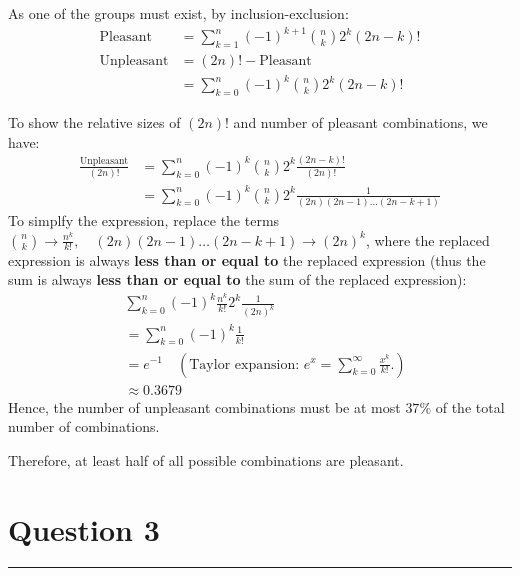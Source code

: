 \documentclass{article}
\begin{document}
\begin{enumerate}[label=(\alph*)]
          As one of the groups must exist, by inclusion-exclusion:
          \begin{align*}
              \text{Pleasant}   & = \sum_{k=1}^{n}(-1)^{k+1}\binom{n}{k}2^{k}(2n-k)! \\
              \text{Unpleasant} & = (2n)! - \text{Pleasant}                          \\
                                & =  \sum_{k=0}^{n}(-1)^{k}\binom{n}{k}2^{k}(2n-k)!
          \end{align*}

          To show the relative sizes of $(2n)!$ and number of pleasant combinations, we have:
          \begin{align*}
              \frac{\text{Unpleasant}}{(2n)!} & = \sum_{k=0}^{n}(-1)^{k}\binom{n}{k}2^{k}\frac{(2n-k)!}{(2n)!}              \\
                                              & = \sum_{k=0}^{n}(-1)^{k}\binom{n}{k}2^{k}\frac{1}{(2n)(2n-1)\ldots(2n-k+1)}
          \end{align*}
          To simplfy the expression, replace the terms $\binom{n}{k} \to \frac{n^k}{k!},\quad (2n)(2n-1)\ldots(2n-k+1) \to (2n)^k$, where the replaced expression is always \textbf{less than or equal to} the replaced expression (thus the sum is always \textbf{less than or equal to} the sum of the replaced expression):
          \begin{align*}
               & \sum_{k=0}^{n}(-1)^{k}\frac{n^k}{k!}2^{k}\frac{1}{(2n)^k}                     \\
               & = \sum_{k=0}^{n}(-1)^{k}\frac{1}{k!}                                          \\
               & = e^{-1}\quad(\text{Taylor expansion: } e^x=\sum_{k=0}^\infty\frac{x^k}{k!}.) \\
               & \approx 0.3679
          \end{align*}
          Hence, the number of unpleasant combinations must be at most $37\%$ of the total number of combinations.

          Therefore, at least half of all possible combinations are pleasant.
\end{enumerate}

\newpage
\section*{Question 3}
\hrule
\vspace{0.5cm}
\end{document}
